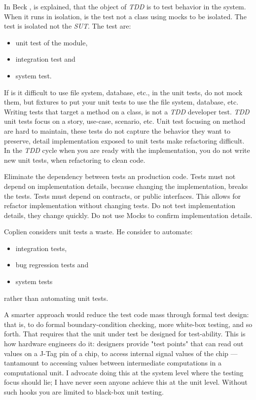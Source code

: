 \documentclass{article}
\begin{document}
In Beck \cite{beck2002driven}, is explained, that the object of \textit{TDD} is to test behavior in the system. When it runs in isolation, is the test not a class using mocks to be isolated. The test is isolated not the \textit{SUT}.
The test are:
\begin{itemize}
	\item unit test of the module,
	\item integration test and
	\item system test.
\end{itemize}

If is it difficult to use file system, database, etc., in the unit tests, do not mock them, but fixtures to put your unit tests to use the file system, database, etc. Writing tests that target a method on a class, is not a \textit{TDD} developer test. \textit{TDD} unit tests focus on a story, use-case, scenario, etc. Unit test focusing on method are hard to maintain, these tests do not capture the behavior they want to preserve, detail implementation exposed to unit tests make refactoring difficult. In the \textit{TDD} cycle when you are ready with the implementation, you do not write new unit tests, when refactoring to clean code.

Eliminate the dependency between tests an production code. Tests must not depend on implementation details, because changing the implementation, breaks the tests. Tests must depend on contracts, or public interfaces. This allows for refactor implementation without changing tests. Do not test implementation details, they change quickly. Do not use Mocks to confirm implementation details.

Coplien \cite{WEBSITE:UnitTestIsWaste} considers unit tests a waste. He consider to automate:
\begin{itemize}
	\item integration tests, 
	\item bug regression tests and 
	\item system tests 
\end{itemize}
rather than automating unit tests. 

A smarter approach would reduce the test code mass through formal test design: that is, to do formal boundary-condition checking, more white-box testing, and so forth. That requires that the unit under test be designed for test-ability. This is how hardware engineers do it: designers provide "test points" that can read out values on a J-Tag pin of a chip, to access internal signal values of the chip — tantamount to accessing values between intermediate computations in a computational unit. I advocate doing this at the system level where the testing focus should lie; I have never seen anyone achieve this at the unit level. Without such hooks you are limited to black-box unit testing. 
\end{document}
